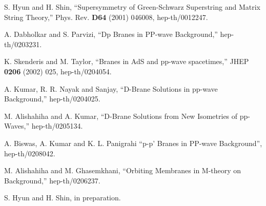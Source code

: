 \documentclass[a4paper,12pt]{article}
\begin{document}
\begin{thebibliography}{99}
 S. Hyun and H. Shin, ``Supersymmetry of Green-Schwarz
  Superstring and Matrix String Theory,'' Phys. Rev. {\bf D64} (2001)
  046008, hep-th/0012247.
  
 A. Dabholkar and S. Parvizi, ``Dp Branes in PP-wave
  Background,'' hep-th/0203231.
  
 K. Skenderis and M. Taylor, ``Branes in AdS and
  pp-wave spacetimes,'' JHEP {\bf 0206} (2002) 025, hep-th/0204054.
  
 A. Kumar, R. R. Nayak and Sanjay, ``D-Brane Solutions
  in pp-wave Background,'' hep-th/0204025.
  
 M. Alishahiha and A. Kumar, ``D-Brane Solutions from
  New Isometries of pp-Waves,'' hep-th/0205134.

 A. Biswas, A. Kumar and K. L. Panigrahi
``p-p' Branes in PP-wave Background'', hep-th/0208042.

 M. Alishahiha and M. Ghasemkhani, ``Orbiting
  Membranes in M-theory on \coordHE{} Background,''
  hep-th/0206237.

 S. Hyun and H. Shin, in preparation. 

\end{thebibliography}
\end{document}
